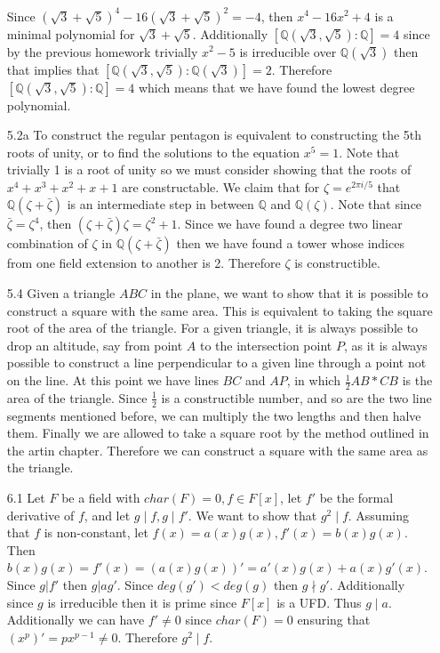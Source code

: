 \documentclass[12pt, letterpaper]{article}
\newcommand{\Q}{\mathbb{Q}}
\begin{document}
\begin{enumerate}
	Since $(\sqrt{3} + \sqrt{5})^4 - 16(\sqrt{3} + \sqrt{5})^2 = -4$, then $x^4 - 16x^2 + 4$ 
	is a minimal polynomial for $\sqrt{3} + \sqrt{5}$.  Additionally  
	$[\Q(\sqrt{3},\sqrt{5}) : \Q] = 4$ since by the previous homework trivially $x^2 - 5$ is 
	irreducible over $\Q(\sqrt{3})$ then that implies that 
	$[\Q(\sqrt{3},\sqrt{5}) : \Q(\sqrt{3})]=2$.  Therefore $[\Q(\sqrt{3},\sqrt{5}) : \Q] = 4$
	which means that we have found the lowest degree polynomial.  
	\item[5.2a] To construct the regular pentagon is equivalent to constructing the 5th roots 
	of unity, or to find the solutions to the equation $x^5 = 1$.  Note that trivially 1 is 
	a root of unity so we must consider showing that the roots of $x^4 + x^3 + x^2 + x + 1$
	are constructable. We claim that for $\zeta = e^{2\pi i/5}$ that $\Q(\zeta + \bar{\zeta})$ 
	is an intermediate step in between $\Q$ and $\Q(\zeta)$.  Note that since 
	$\bar{\zeta} = \zeta^4$, then $(\zeta + \bar{\zeta})\zeta = \zeta^2 + 1$.  Since we 
	have found a degree two linear combination of $\zeta$ in $\Q(\zeta+\bar{\zeta})$ then 
	we have found a tower whose indices from one field extension to another is 2.  Therefore
	$\zeta$ is constructible. 
	\item[5.4] Given a triangle $ABC$ in the plane, we want to show that it is possible to 
	construct a square with the same area. This is equivalent to taking the square root of 
	the area of the triangle.  For a given triangle, it is always possible to drop an altitude,
	say from point $A$ to the intersection point $P$, as it is always possible to construct a 
	line perpendicular to a given line through a point not on the line.  At this point we have
	lines $BC$ and $AP$, in which $\frac{1}{2}AB*CB$ is the area of the triangle.  Since 
	$\frac{1}{2}$ is a constructible number, and so are the two line segments mentioned before,
	we can multiply the two lengths and then halve them.  Finally we are allowed to take a 
	square root by the method outlined in the artin chapter.  Therefore we can construct a 
	square with the same area as the triangle.  
	\item[6.1] Let $F$ be a field with $char(F) = 0, f \in F[x]$, let $f'$ be the 
	formal derivative of $f$, and let $g \mid f, g \mid f'$.  We want to show that $g^2 \mid f$.
	Assuming that $f$ is non-constant, let $f(x) = a(x)g(x), f'(x) = b(x)g(x)$.  
	Then $b(x)g(x) = f'(x) = (a(x)g(x))' = a'(x)g(x) + a(x)g'(x)$.  Since $g | f'$ then 
	$g|a g'$.  Since $deg(g') < deg(g)$ then $g \nmid g'$.  Additionally since $g$ is 
	irreducible then it is prime since $F[x]$ is a UFD.  Thus $g \mid a$.  Additionally 
	we can have $f' \neq 0$ since $char(F) = 0$ ensuring that $(x^p)' = px^{p-1} \neq 0$.
	Therefore $g^2 \mid f$.  
\end{enumerate}
\end{document}
